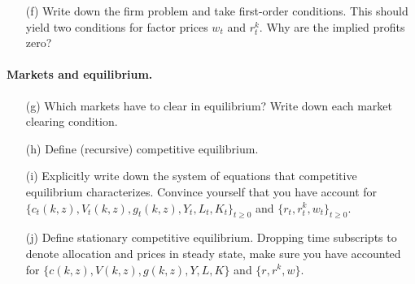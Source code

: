 \documentclass[11pt]{extarticle}
\theoremstyle{plain}
\theoremstyle{definition}
\begin{document}
\begin{enumerate}
	\item [(f)] Write down the firm problem and take first-order conditions. This should yield two conditions for factor prices $w_t$ and $r_t^k$. Why are the implied profits zero? 
\end{enumerate}


\paragraph{Markets and equilibrium.}


\begin{enumerate}
\item [(g)] Which markets have to clear in equilibrium? Write down each market clearing condition.

\item [(h)] Define (recursive) competitive equilibrium. 

\item [(i)] Explicitly write down the system of equations that competitive equilibrium characterizes. Convince yourself that you have account for $\{c_t(k, z), V_t(k, z), g_t(k, z), Y_t, L_t, K_t\}_{t \geq 0}$ and $\{r_t, r_t^k, w_t\}_{t \geq 0}$. 

\item [(j)] Define stationary competitive equilibrium. Dropping time subscripts to denote allocation and prices in steady state, make sure you have accounted for $\{c(k, z), V(k, z), g(k, z), Y, L, K\}$ and $\{r, r^k, w\}$. 
\end{enumerate}
\end{document}
